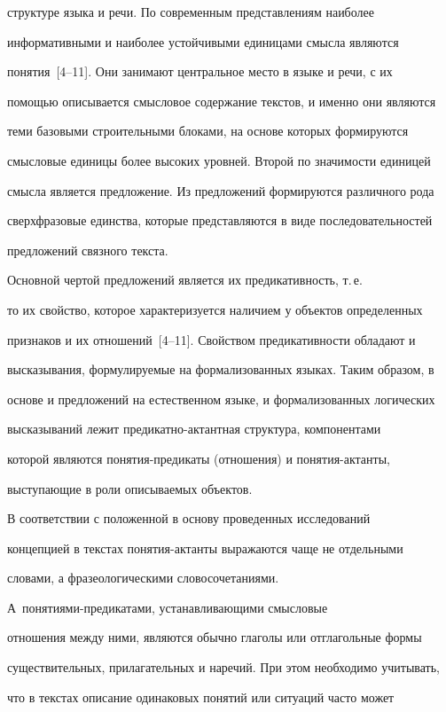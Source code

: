 структуре языка и речи. По современным представлениям наиболее 

информативными и наиболее устойчивыми единицами смысла являются 

понятия~[4--11]. Они занимают центральное место в языке и речи, с их 

помощью описывается смысловое содержание текстов, и именно они являются 

теми базовыми строительными блоками, на основе которых формируются 

смысловые единицы более высоких уровней. Второй по значимости единицей 

смысла является предложение. Из предложений формируются различного рода 

сверхфразовые единства, которые представляются в виде последовательностей 

предложений связного текста.

     

     Основной чертой предложений является их предикативность, т.\,е.\ 

то их свойство, которое характеризуется наличием у объектов определенных 

признаков и их отношений~[4--11]. Свойством предикативности обладают и 

высказывания, формулируемые на формализованных языках. Таким образом, в 

основе и предложений на естественном языке, и формализованных логических 

высказываний лежит пре\-ди\-кат\-но-ак\-тант\-ная структура, компонентами 

которой являются понятия-предикаты (отношения) и по\-ня\-тия-ак\-тан\-ты, 

выступающие в роли описываемых объектов.

     

     В соответствии с положенной в основу проведенных исследований 

концепцией в текстах по\-ня\-тия-ак\-тан\-ты выражаются чаще не отдельными 

словами, а фразеологическими словосочетаниями. 

     А~по\-ня\-ти\-ями-пре\-ди\-ка\-та\-ми, устанавливающими смысловые 

отношения между ними, являются обычно глаголы или отглагольные формы 

существительных, прилагательных и наречий. При этом необходимо учитывать, 

что в текстах описание одинаковых понятий или ситуаций часто может 

